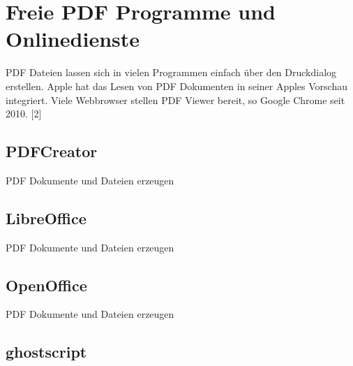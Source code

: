 \section{Freie PDF Programme und Onlinedienste}
PDF Dateien lassen sich in vielen Programmen einfach über den Druckdialog erstellen. Apple hat das Lesen von PDF Dokumenten in seiner Apples Vorschau integriert. Viele Webbrowser stellen PDF Viewer bereit, so Google Chrome seit 2010. [2]

\subsection{PDFCreator}
PDF Dokumente und Dateien erzeugen

\subsection{LibreOffice}
PDF Dokumente und Dateien erzeugen

\subsection{OpenOffice}
PDF Dokumente und Dateien erzeugen

\subsection{ghostscript}

